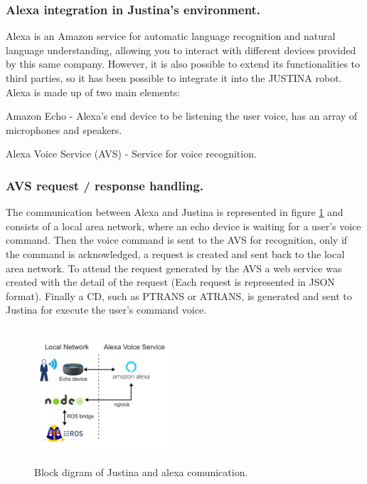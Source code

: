 \documentclass{llncs}
\begin{document}
\subsubsection{Alexa integration in Justina's environment.} Alexa is an Amazon service for automatic language recognition and natural language understanding, allowing you to interact with different devices provided by this same company. However, it is also possible to extend its functionalities to third parties, so it has been possible to integrate it into the JUSTINA robot. Alexa is made up of two main elements:
\vspace{.01 in}

	Amazon Echo - Alexa's end device to be listening the user voice, has an array of microphones and speakers.
\vspace{.01 in}

	Alexa Voice Service (AVS) - Service for voice recognition.
\vspace{.01 in}

\subsubsection{AVS request / response handling.}

The communication between Alexa and Justina is represented in figure \ref{fig:alexaconexion} and 
consists of a local area network, 
where an echo device is waiting for a user's voice command. 
Then the voice command is sent to the AVS for recognition, 
only if the command is acknowledged, 
a request is created and sent back to the local area network. 
To attend the request generated by the AVS a web service was created with the detail of the request (Each request is represented in JSON format). 
Finally a CD, such as PTRANS or ATRANS, is generated and sent to Justina for execute the user's command voice.
\begin{figure}[h]
	\centering
	\includegraphics[angle=0, height=5cm, width=5cm]{Figures/alexa2.png}
	\caption{Block digram of Justina and alexa comunication.}
	\label{fig:alexaconexion}
\end{figure}
\end{document}

